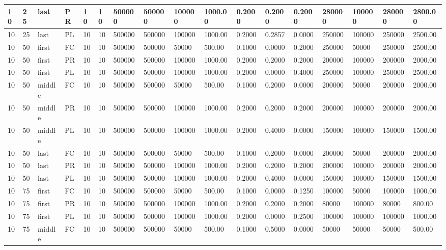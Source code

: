 \begin{tabular}{|l|l|l|l|l|l|l|l|l|l|l|l|l|l|l|l|l|}
10 & 25 & last & PR & 10 & 10 & 500000 & 500000 & 100000 & 1000.00 & 0.2000 & 0.2000 & 0.2000 & 280000 & 100000 & 280000 & 2800.00 \\ \hline
10 & 25 & last & PL & 10 & 10 & 500000 & 500000 & 100000 & 1000.00 & 0.2000 & 0.2857 & 0.0000 & 250000 & 100000 & 250000 & 2500.00 \\ \hline
10 & 50 & first & FC & 10 & 10 & 500000 & 500000 & 50000 & 500.00 & 0.1000 & 0.0000 & 0.2000 & 250000 & 50000 & 250000 & 2500.00 \\ \hline
10 & 50 & first & PR & 10 & 10 & 500000 & 500000 & 100000 & 1000.00 & 0.2000 & 0.2000 & 0.2000 & 200000 & 100000 & 200000 & 2000.00 \\ \hline
10 & 50 & first & PL & 10 & 10 & 500000 & 500000 & 100000 & 1000.00 & 0.2000 & 0.0000 & 0.4000 & 250000 & 100000 & 250000 & 2500.00 \\ \hline
10 & 50 & middle & FC & 10 & 10 & 500000 & 500000 & 50000 & 500.00 & 0.1000 & 0.2000 & 0.0000 & 200000 & 50000 & 200000 & 2000.00 \\ \hline
10 & 50 & middle & PR & 10 & 10 & 500000 & 500000 & 100000 & 1000.00 & 0.2000 & 0.2000 & 0.2000 & 200000 & 100000 & 200000 & 2000.00 \\ \hline
10 & 50 & middle & PL & 10 & 10 & 500000 & 500000 & 100000 & 1000.00 & 0.2000 & 0.4000 & 0.0000 & 150000 & 100000 & 150000 & 1500.00 \\ \hline
10 & 50 & last & FC & 10 & 10 & 500000 & 500000 & 50000 & 500.00 & 0.1000 & 0.2000 & 0.0000 & 200000 & 50000 & 200000 & 2000.00 \\ \hline
10 & 50 & last & PR & 10 & 10 & 500000 & 500000 & 100000 & 1000.00 & 0.2000 & 0.2000 & 0.2000 & 200000 & 100000 & 200000 & 2000.00 \\ \hline
10 & 50 & last & PL & 10 & 10 & 500000 & 500000 & 100000 & 1000.00 & 0.2000 & 0.4000 & 0.0000 & 150000 & 100000 & 150000 & 1500.00 \\ \hline
10 & 75 & first & FC & 10 & 10 & 500000 & 500000 & 50000 & 500.00 & 0.1000 & 0.0000 & 0.1250 & 100000 & 50000 & 100000 & 1000.00 \\ \hline
10 & 75 & first & PR & 10 & 10 & 500000 & 500000 & 100000 & 1000.00 & 0.2000 & 0.2000 & 0.2000 & 80000 & 100000 & 80000 & 800.00 \\ \hline
10 & 75 & first & PL & 10 & 10 & 500000 & 500000 & 100000 & 1000.00 & 0.2000 & 0.0000 & 0.2500 & 100000 & 100000 & 100000 & 1000.00 \\ \hline
10 & 75 & middle & FC & 10 & 10 & 500000 & 500000 & 50000 & 500.00 & 0.1000 & 0.5000 & 0.0000 & 50000 & 50000 & 50000 & 500.00 \\ \hline

\end{tabular}
